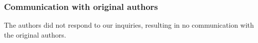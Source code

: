 \subsubsection*{Communication with original authors}

The authors did not respond to our inquiries, resulting in no communication with the original authors.